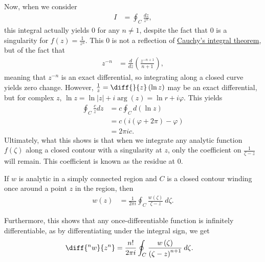 \documentclass[10pt]{mypackage}
\begin{document}
Now, when we consider
\begin{align*}
  I &= \oint_{C}\frac{dz}{z^n},
\end{align*}
this integral actually yields $0$ for any $n\neq 1$, despite the fact that $0$ is a singularity for $f(z) = \frac{1}{z^n}$. This $0$ is not a reflection of \hyperref[thm:cauchy_integral_thm]{Cauchy's integral theorem}, but of the fact that
\begin{align*}
  z^{-n} &= \frac{d}{dz}\left(\frac{z^{-n+1}}{n+1}\right),
\end{align*}
meaning that $z^{-n}$ is an exact differential, so integrating along a closed curve yields zero change. However, $\frac{1}{z} = \diff{}{z}\left(\ln z\right)$ may be an exact differential, but for complex $z$, $\ln z = \ln\left\vert z \right\vert + i\arg(z) = \ln r + i\varphi$. This yields
\begin{align*}
  \oint_{C} \frac{c}{z}dz &= c\oint_{C} d\left(\ln z\right)\\
                          &= c\left(i\left(\varphi + 2\pi\right) - \varphi\right)\\
                          &= 2\pi i c.
\end{align*}
Ultimately, what this shows is that when we integrate any analytic function $f\left(\zeta\right)$ along a closed contour with a singularity at $z$, only the coefficient on $\frac{1}{\zeta -z}$ will remain. This coefficient is known as the residue at $0$.
\begin{theorem}
  If $w$ is analytic in a simply connected region and $C$ is a closed contour winding once around a point $z$ in the region, then
  \begin{align*}
    w(z) &= \frac{1}{2\pi i} \oint_{C}\frac{w\left(\zeta\right)}{\zeta - z}\:d\zeta.\label{thm:cauchy_integral_formula}\tag{\textasteriskcentered\textasteriskcentered}
  \end{align*}
\end{theorem}
Furthermore, this shows that any once-differentiable function is infinitely differentiable, as by differentiating under the integral sign, we get
\begin{align*}
  \diff{^nw}{z^n} &= \frac{n!}{2\pi i} \oint_{C} \frac{w\left(\zeta\right)}{\left(\zeta - z\right)^{n+1}}\: d\zeta.
\end{align*}
\end{document}
